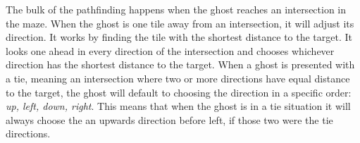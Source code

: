The bulk of the pathfinding happens when the ghost reaches an intersection in the maze.
When the ghost is one tile away from an intersection, it will adjust its direction.
It works by finding the tile with the shortest distance to the target.
It looks one ahead in every direction of the intersection and chooses whichever direction has the shortest distance to the target.
When a ghost is presented with a tie, meaning an intersection where two or more directions have equal distance to the target, the ghost will default to choosing the direction in a specific order: \emph{up, left, down, right}\cite{Pittman2011}.
This means that when the ghost is in a tie situation it will always choose the an upwards direction before left, if those two were the tie directions.
